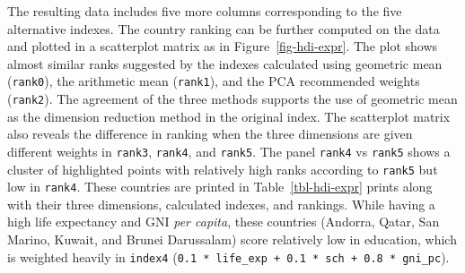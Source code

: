 \documentclass[
]{interact}
\begin{document}
The resulting data includes five more columns corresponding to the five
alternative indexes. The country ranking can be further computed on the
data and plotted in a scatterplot matrix as in
Figure~\ref{fig-hdi-expr}. The plot shows almost similar ranks suggested
by the indexes calculated using geometric mean (\texttt{rank0}), the
arithmetic mean (\texttt{rank1}), and the PCA recommended weights
(\texttt{rank2}). The agreement of the three methods supports the use of
geometric mean as the dimension reduction method in the original index.
The scatterplot matrix also reveals the difference in ranking when the
three dimensions are given different weights in \texttt{rank3},
\texttt{rank4}, and \texttt{rank5}. The panel \texttt{rank4} vs
\texttt{rank5} shows a cluster of highlighted points with relatively
high ranks according to \texttt{rank5} but low in \texttt{rank4}. These
countries are printed in Table~\ref{tbl-hdi-expr} prints along with
their three dimensions, calculated indexes, and rankings. While having a
high life expectancy and GNI \emph{per capita}, these countries
(Andorra, Qatar, San Marino, Kuwait, and Brunei Darussalam) score
relatively low in education, which is weighted heavily in
\texttt{index4}
(\texttt{0.1\ *\ life\_exp\ +\ 0.1\ *\ sch\ +\ 0.8\ *\ gni\_pc}).
\end{document}
